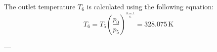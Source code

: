 The outlet temperature \( T_6 \) is calculated using the following equation:  
\[
T_6 = T_5 \left( \frac{p_0}{p_5} \right)^{\frac{\kappa - 1}{\kappa}} = 328.075 \, \text{K}
\]  

---